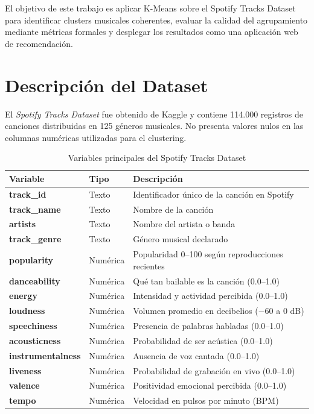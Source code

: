 \documentclass[12pt, a4paper]{article}
\begin{document}
El objetivo de este trabajo es aplicar K-Means sobre el Spotify Tracks
Dataset para identificar clusters musicales coherentes, evaluar la calidad
del agrupamiento mediante métricas formales y desplegar los resultados como
una aplicación web de recomendación.

\section{Descripción del Dataset}

El \textit{Spotify Tracks Dataset} fue obtenido de Kaggle
\cite{spotifyKaggle} y contiene 114.000 registros de canciones
distribuidas en 125 géneros musicales. No presenta valores nulos en las
columnas numéricas utilizadas para el clustering.

\begin{table}[H]
\centering
\caption{Variables principales del Spotify Tracks Dataset}
\small
\begin{tabular}{>{\bfseries}p{3.8cm} p{2.2cm} p{6.5cm}}
\toprule
Variable & Tipo & Descripción \\
\midrule
track\_id          & Texto    & Identificador único de la canción en Spotify \\
track\_name        & Texto    & Nombre de la canción \\
artists            & Texto    & Nombre del artista o banda \\
track\_genre       & Texto    & Género musical declarado \\
popularity         & Numérica & Popularidad 0--100 según reproducciones recientes \\
danceability       & Numérica & Qué tan bailable es la canción (0.0--1.0) \\
energy             & Numérica & Intensidad y actividad percibida (0.0--1.0) \\
loudness           & Numérica & Volumen promedio en decibelios ($-60$ a 0 dB) \\
speechiness        & Numérica & Presencia de palabras habladas (0.0--1.0) \\
acousticness       & Numérica & Probabilidad de ser acústica (0.0--1.0) \\
instrumentalness   & Numérica & Ausencia de voz cantada (0.0--1.0) \\
liveness           & Numérica & Probabilidad de grabación en vivo (0.0--1.0) \\
valence            & Numérica & Positividad emocional percibida (0.0--1.0) \\
tempo              & Numérica & Velocidad en pulsos por minuto (BPM) \\
\bottomrule
\end{tabular}
\label{tab:variables}
\end{table}
\end{document}
